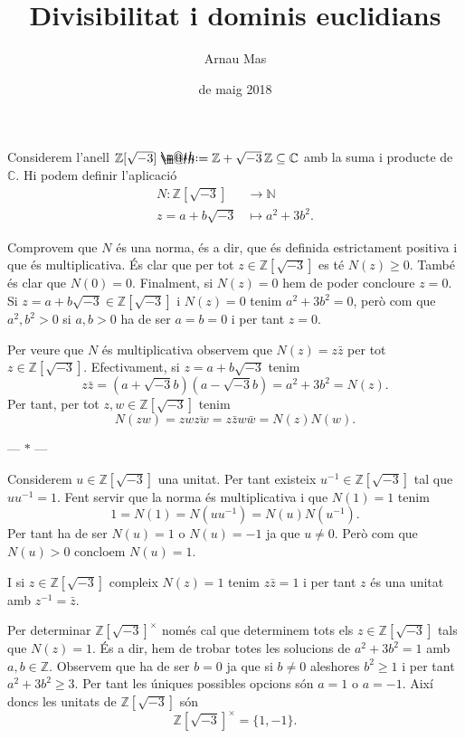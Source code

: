 \documentclass[12pt]{article}
\title{\sffamily {\bfseries Entrega 2:} Divisibilitat i dominis euclidians}
\author{\sffamily Arnau Mas}
\date{\sffamily 18 de maig 2018}
\makeatletter
\newcommand{\Z}{\mathbb{Z}}
\newcommand{\R}{\Z[\sqrt{-3}]}
\newcommand{\N}{\mathbb{N}}
\newcommand{\C}{\mathbb{C}}
\newcommand{\unit}[1]{#1^{\times}}
\newcommand{\parbreak}{
	\begin{center}
		--- $\ast$ ---
	\end{center} 
}
\newcommand*{\defeq}{\mathrel{\rlap{%
    \raisebox{0.3ex}{$\m@th\cdot$}}%
  \raisebox{-0.3ex}{$\m@th\cdot$}}%
	=
}
\makeatother
\begin{document}
\maketitle

Considerem l'anell \( \R \defeq \Z + \sqrt{-3}\,\Z \subseteq \C \) amb la suma i producte de \( \C \). Hi podem definir l'aplicació
\begin{align*}
	N \colon \R & \longrightarrow \N \\
	z = a + b\sqrt{-3} & \longmapsto a^2 + 3b^2.
\end{align*}

Comprovem que \( N \) és una norma, és a dir, que és definida estrictament positiva i que és multiplicativa. És clar que per tot \( z \in \R \) es té \( N(z) \geq 0 \). També és clar que \( N(0) = 0 \). Finalment, si \( N(z) = 0 \) hem de poder concloure \( z = 0 \). Si \( z = a + b \sqrt{-3} \in \R \) i \( N(z) = 0 \) tenim \( a^2 + 3b^2 = 0 \), però com que \( a^2, b^2 > 0 \) si \( a,b > 0 \) ha de ser \( a = b = 0 \) i per tant \( z = 0 \).

Per veure que \( N \) és multiplicativa observem que \( N(z) = z\bar{z} \) per tot \( z \in \R \). Efectivament, si \( z = a+b\sqrt{-3} \) tenim
\begin{equation*}
	z\bar{z} = (a + \sqrt{-3}b)(a - \sqrt{-3}b) = a^2 + 3b^2 = N(z).
\end{equation*}
Per tant, per tot \( z, w \in \R \) tenim
\begin{equation*}
	N(zw) = zw \overline{zw} = z\bar{z} w\bar{w} = N(z) N(w).
\end{equation*}

\parbreak

Considerem \( u \in \R \) una unitat. Per tant existeix \( u^{-1} \in \R \) tal que \( uu^{-1} = 1 \). Fent servir que la norma és multiplicativa i que \( N(1) = 1 \) tenim
\begin{equation*}
	1 = N(1) = N(uu^{-1}) = N(u) N(u^{-1}).
\end{equation*}
Per tant ha de ser \( N(u) = 1 \) o \( N(u) = -1 \) ja que \( u \neq 0 \). Però com que \( N(u) > 0 \) concloem \( N(u) = 1 \).  

I si \( z \in \R \) compleix \( N(z) = 1 \) tenim \( z\bar{z} = 1 \) i per tant \( z \) és una unitat amb \( z^{-1} = \bar{z} \).

Per determinar \( \unit{\R} \) només cal que determinem tots els \( z \in \R \) tals que \( N(z) = 1 \). És a dir, hem de trobar totes les solucions de \( a^2 + 3b^2 = 1 \) amb \( a, b \in \Z \). Observem que ha de ser \( b = 0 \) ja que si \( b \neq 0 \) aleshores \( b^2 \geq 1 \) i per tant \( a^2 + 3b^2 \geq 3 \). Per tant les úniques possibles opcions són \( a = 1 \) o \( a = -1 \). Així doncs les unitats de \( \R \) són
\begin{equation*}
	\unit{\R} = \{1, -1\}.
\end{equation*}
\end{document}
